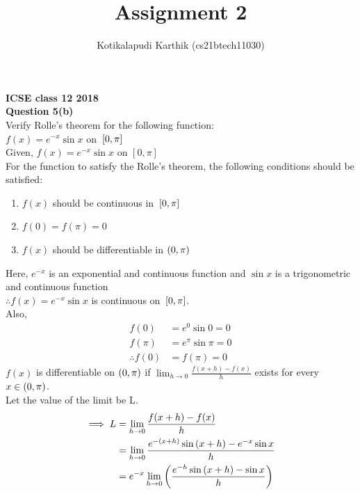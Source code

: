 \documentclass[journal,12pt,twocolumn]{IEEEtran}
\begin{document}
\let\vec\mathbf
\def\putbox#1#2#3{\makebox[0in][l]{\makebox[#1][l]{}\raisebox{\baselineskip}[0in][0in]{\raisebox{#2}[0in][0in]{#3}}}}
     \def\rightbox#1{\makebox[0in][r]{#1}}
     \def\centbox#1{\makebox[0in]{#1}}
     \def\topbox#1{\raisebox{-\baselineskip}[0in][0in]{#1}}
     \def\midbox#1{\raisebox{-0.5\baselineskip}[0in][0in]{#1}}
\title{ Assignment 2 }
\author{ Kotikalapudi Karthik (cs21btech11030)%
}
\maketitle
\textbf{ICSE class 12 2018}\\
\textbf{Question 5(b)}\\
Verify Rolle's theorem for the following function:\\
$f(x) = e^{-x} \sin x$ on ${}\left[0,\pi\right]$\\
\solution
Given, $f(x) = e^{-x} \sin x$ on $[0,\pi]$\\
For the function to satisfy the Rolle's theorem, the following conditions should be satisfied:
\begin{enumerate}
    \item $f(x)$ should be continuous in ${}\left[0,\pi\right]$
    \item $f(0) = f(\pi) = 0$
    \item $f(x)$ should be differentiable in $\left(0,\pi\right)$
\end{enumerate}
Here, $e^{-x}$ is an exponential and continuous function and $\sin x$ is a trigonometric and continuous function\\
$\therefore f(x) = e^{-x} \sin x$ is continuous on ${}\left[0,\pi\right]$.\\
Also,
\begin{align}
    f(0) &= e^{0} \sin 0 = 0\\
    f(\pi) &= e^{\pi} \sin \pi = 0\\
    \therefore f(0) &= f(\pi) = 0
\end{align}
$f(x)$ is differentiable on $\left(0,\pi\right)$ if $\lim_{h \to 0} \frac{f(x+h)-f(x)}{h}$ exists for every $x \in \left(0,\pi\right)$.\\
Let the value of the limit be L.
\begin{align}
    \implies L &= \lim_{h \to 0} \frac{f(x+h)-f(x)}{h}\\
    &= \lim_{h \to 0} \frac{e^{-\left(x+h\right)} \sin \left(x+h\right) - e^{-x} \sin x}{h}\\
    \label{eq-1}
    &= e^{-x} \lim_{h \to 0} \left(\frac{e^{-h} \sin \left(x+h\right) - \sin x}{h}\right)
\end{align}
\end{document}

